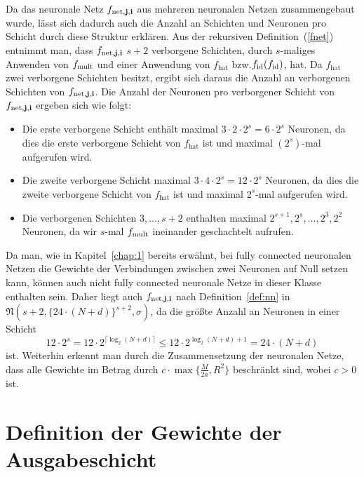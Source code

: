 Da das neuronale Netz $f_{\mathrm{net},\mathbf{j},\mathbf{i}}$ aus mehreren neuronalen Netzen zusammengebaut wurde, lässt sich dadurch auch die Anzahl an Schichten und Neuronen pro Schicht durch diese Struktur erklären. Aus der rekursiven Definition~(\ref{fnet}) entnimmt man, dass $f_{\mathrm{net},\mathbf{j},\mathbf{i}}$ $s + 2$ verborgene Schichten, durch $s$-maliges Anwenden von $f_{\mathrm{mult}}$ und einer Anwendung von $f_{\mathrm{hat}}$ bzw.\@ $f_{\mathrm{id}}(f_{\mathrm{id}})$, hat. Da $f_{\mathrm{hat}}$ zwei verborgene Schichten besitzt, ergibt sich daraus die Anzahl an verborgenen Schichten von $f_{\mathrm{net},\mathbf{j},\mathbf{i}}$.
Die Anzahl der Neuronen pro verborgener Schicht von $f_{\mathrm{net},\mathbf{j},\mathbf{i}}$ ergeben sich wie folgt:
\begin{itemize}
\item Die erste verborgene Schicht enthält maximal $3 \cdot 2 \cdot 2^s = 6 \cdot 2^s$ Neuronen, da dies die erste verborgene Schicht von $f_{\mathrm{hat}}$ ist und maximal $(2^s)$-mal aufgerufen wird. 
\item Die zweite verborgene Schicht maximal $3 \cdot 4 \cdot 2^s = 12\cdot 2^s$ Neuronen, da dies die zweite verborgene Schicht von $f_{\mathrm{hat}}$ ist und maximal $2^s$-mal aufgerufen wird.
\item Die verborgenen Schichten $3,\dots,s + 2$ enthalten maximal   $2^{s+ 1}, 2^s, \dots, 2^3, 2^2$ Neuronen, da wir $s$-mal $f_{\mathrm{mult}}$ ineinander geschachtelt aufrufen. 
\end{itemize}  
Da man, wie in Kapitel~\ref{chap:1} bereits erwähnt, bei fully connected neuronalen Netzen die Gewichte der Verbindungen zwischen zwei Neuronen auf Null setzen kann, können auch nicht fully connected neuronale Netze in dieser Klasse enthalten sein. Daher liegt auch $f_{\mathrm{net},\mathbf{j},\mathbf{i}}$ nach Definition~\ref{def:nn} in $\mathfrak{N}(s + 2,\{24 \cdot (N + d)\}^{s + 2},\sigma)$, da die größte Anzahl an Neuronen in einer Schicht $$12 \cdot 2^s = 12 \cdot 2^{\lceil\log_2(N + d)\rceil} \leq 12 \cdot 2^{\log_2(N + d) + 1} = 24 \cdot (N + d)$$ ist. Weiterhin erkennt man durch die Zusammensetzung der neuronalen Netze, dass alle Gewichte im Betrag durch $c \cdot \max\{\frac{M}{2a}, R^2\}$ beschränkt sind, wobei $c > 0$ ist. 

\section{Definition der Gewichte der Ausgabeschicht}
\label{subsec:2.2}


